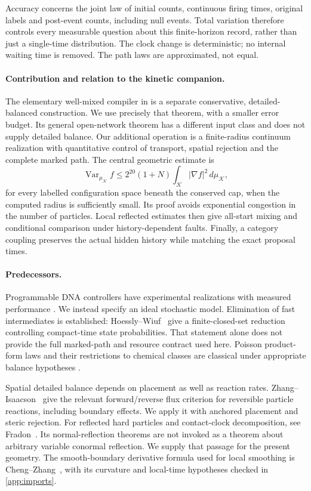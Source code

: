 \documentclass[11pt]{article}
\numberwithin{equation}{section}
\theoremstyle{definition}
\theoremstyle{remark}\newtheorem{remark}[theorem]{Remark}
\newcommand{\Var}{\operatorname{Var}}
\newcommand{\K}{\mathcal K}
\newcommand{\dd}{\,d}
\begin{document}
Accuracy concerns the joint law of initial counts, continuous firing times,
original labels and post-event counts, including null events. Total variation
therefore controls every measurable question about this finite-horizon record,
rather than just a single-time distribution. The clock change is deterministic;
no internal waiting time is removed. The path laws are approximated, not equal.

\paragraph{Contribution and relation to the kinetic companion.}
The elementary well-mixed compiler in \cite[Theorem~9.1]{Sandhu2026} is a
separate conservative, detailed-balanced construction. We use precisely that
theorem, with a smaller error budget. Its general open-network theorem has
a different input class and does not supply detailed balance. Our additional
operation is a finite-radius continuum realization with quantitative control
of transport, spatial rejection and the complete marked path. The central
geometric estimate is
\[
 \Var_{\mu_\K} f\le 2^{20}(1+N)\int_\K|\nabla f|^2\dd\mu_\K,
\]
for every labelled configuration space beneath the conserved cap, when the
computed radius is sufficiently small. Its proof avoids exponential
congestion in the number of particles. Local reflected estimates then give
all-start mixing and conditional comparison under history-dependent faults.
Finally, a category coupling preserves the actual hidden history while
matching the exact proposal times.

\paragraph{Predecessors.}
Programmable DNA controllers have experimental realizations with measured
performance \cite{Chen2013}. We instead specify an ideal stochastic model.
Elimination of fast intermediates is established:
Hoessly--Wiuf~\cite[Assumption~2 and Theorem~4.1]{HW2021} give a
finite-closed-set reduction controlling compact-time state probabilities.
That statement alone does not provide the full marked-path and resource
contract used here. Poisson product-form laws and their restrictions to
chemical classes are classical under appropriate balance hypotheses
\cite[Theorem~4.1 and Section~4.2]{ACK2010}.

Spatial detailed balance depends on placement as well as reaction rates.
Zhang--Isaacson~\cite[Section~III and Theorem~III.1]{ZI2022} give the relevant
forward/reverse flux criterion for reversible particle reactions, including
boundary effects. We apply it with anchored placement and steric rejection.
For reflected hard particles and contact-clock decomposition, see
Fradon~\cite[Theorem~2.2 and Proposition~3.4]{Fradon2009}. Its normal-reflection
theorems are not invoked as a theorem about arbitrary variable conormal
reflection. We supply that passage for the present geometry.
The smooth-boundary derivative formula used for local smoothing is
Cheng--Zhang~\cite[Theorem~2.5]{CZ2017}, with its curvature and local-time
hypotheses checked in \cref{app:imports}.
\end{document}
